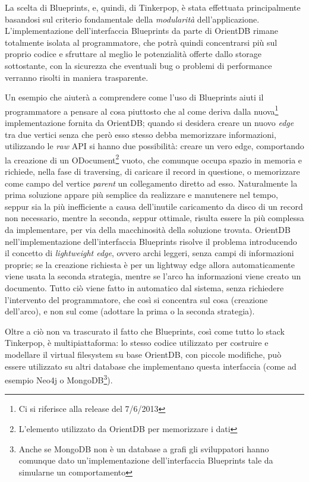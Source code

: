 La scelta di Blueprints, e, quindi, di Tinkerpop, è stata effettuata principalmente basandosi sul criterio fondamentale della \emph{modularità} dell'applicazione. L'implementazione dell'interfaccia Blueprints da parte di OrientDB rimane totalmente isolata al programmatore, che potrà quindi concentrarsi più sul proprio codice e sfruttare al meglio le potenzialità offerte dallo storage sottostante, con la sicurezza che eventuali bug o problemi di performance verranno risolti in maniera trasparente.

Un esempio che aiuterà a comprendere come l'uso di Blueprints aiuti il programmatore a pensare al cosa piuttosto che al come deriva dalla nuova\footnote{Ci si riferisce alla release del 7/6/2013} implementazione fornita da OrientDB; quando si desidera creare un nuovo \emph{edge} tra due vertici senza che però esso stesso debba memorizzare informazioni, utilizzando le \emph{raw} API si hanno due possibilità: creare un vero edge, comportando la creazione di un ODocument\footnote{L'elemento utilizzato da OrientDB per memorizzare i dati} vuoto, che comunque occupa spazio in memoria e richiede, nella fase di traversing, di caricare il record in questione, o memorizzare come campo del vertice \emph{parent} un collegamento diretto ad esso. Naturalmente la prima soluzione appare più semplice da realizzare e manutenere nel tempo, seppur sia la più inefficiente a causa dell'inutile caricamento da disco di un record non necessario, mentre la seconda, seppur ottimale, risulta essere la più complessa da implementare, per via della macchinosità della soluzione trovata. OrientDB nell'implementazione dell'interfaccia Blueprints risolve il problema introducendo il concetto di \emph{lightweight edge}, ovvero archi leggeri, senza campi di informazioni proprie; se la creazione richiesta è per un lightway edge allora automaticamente viene usata la seconda strategia, mentre se l'arco ha informazioni viene creato un documento. Tutto ciò viene fatto in automatico dal sistema, senza richiedere l'intervento del programmatore, che così si concentra sul cosa (creazione dell'arco), e non sul come (adottare la prima o la seconda strategia).

Oltre a ciò non va trascurato il fatto che Blueprints, così come tutto lo stack Tinkerpop, è multipiattaforma: lo stesso codice utilizzato per costruire e modellare il virtual filesystem su base OrientDB, con piccole modifiche, può essere utilizzato su altri database che implementano questa interfaccia (come ad esempio Neo4j o MongoDB\footnote{Anche se MongoDB non è un database a grafi gli sviluppatori hanno comunque dato un'implementazione dell'interfaccia Blueprints tale da simularne un comportamento}).


